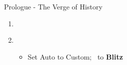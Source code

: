 \begin{battlespecial}{Prologue - The Verge of History}
\begin{enumerate}
\item \ 
\begin{itemize}
\pair{\chrom}{\robin}
\auto
\end{itemize}
\item \ 
\begin{itemize}
\item Set Auto to Custom; \robin\ to \textbf{Blitz}
\auto
\end{itemize}
\autoturn
\autoturn
\end{enumerate}
\end{battlespecial}